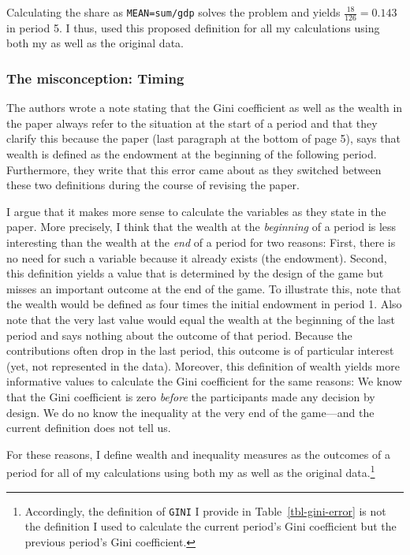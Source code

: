 \documentclass[
  authoryear,
  review,
  3p,
  onecolumn]{elsarticle}
\begin{document}
Calculating the share as \texttt{MEAN=sum/gdp} solves the problem and
yields \(\frac{18}{126}=0.143\) in period 5. I thus, used this proposed
definition for all my calculations using both my as well as the original
data.

\hypertarget{the-misconception-timing}{%
\subsubsection{The misconception:
Timing}\label{the-misconception-timing}}

The authors wrote a note stating that the Gini coefficient as well as
the wealth in the paper always refer to the situation at the start of a
period and that they clarify this because the paper (last paragraph at
the bottom of page 5), says that wealth is defined as the endowment at
the beginning of the following period. Furthermore, they write that this
error came about as they switched between these two definitions during
the course of revising the paper.

I argue that it makes more sense to calculate the variables as they
state in the paper. More precisely, I think that the wealth at the
\emph{beginning} of a period is less interesting than the wealth at the
\emph{end} of a period for two reasons: First, there is no need for such
a variable because it already exists (the endowment). Second, this
definition yields a value that is determined by the design of the game
but misses an important outcome at the end of the game. To illustrate
this, note that the wealth would be defined as four times the initial
endowment in period 1. Also note that the very last value would equal
the wealth at the beginning of the last period and says nothing about
the outcome of that period. Because the contributions often drop in the
last period, this outcome is of particular interest (yet, not
represented in the data). Moreover, this definition of wealth yields
more informative values to calculate the Gini coefficient for the same
reasons: We know that the Gini coefficient is zero \emph{before} the
participants made any decision by design. We do no know the inequality
at the very end of the game---and the current definition does not tell
us.

For these reasons, I define wealth and inequality measures as the
outcomes of a period for all of my calculations using both my as well as
the original data.\footnote{Accordingly, the definition of \texttt{GINI}
  I provide in Table~\ref{tbl-gini-error} is not the definition I used
  to calculate the current period's Gini coefficient but the previous
  period's Gini coefficient.}
\end{document}
